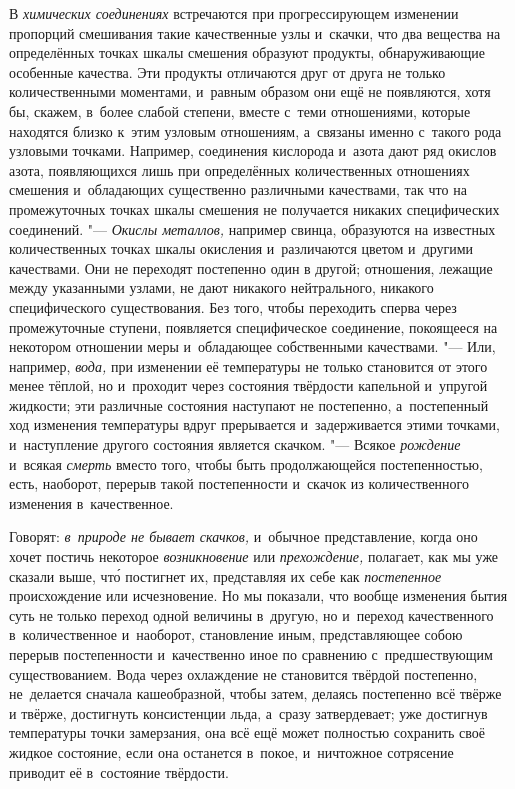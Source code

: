 В {\em химических соединениях} встречаются при прогрессирующем изменении
пропорций смешивания такие качественные узлы и~скачки, что два вещества на
определённых точках шкалы смешения образуют продукты, обнаруживающие особенные
качества. Эти продукты отличаются друг от друга не только количественными
моментами, и~равным образом они ещё не появляются, хотя бы, скажем, в~более
слабой степени, вместе с~теми отношениями, которые находятся близко к~этим
узловым отношениям, а~связаны именно с~такого рода узловыми точками. Например,
соединения кислорода и~азота дают ряд окислов азота, появляющихся лишь при
определённых количественных отношениях смешения и~обладающих существенно
различными качествами, так что на промежуточных точках шкалы смешения не
получается никаких специфических соединений. "--- {\em Окислы металлов,}
например свинца, образуются на известных количественных точках шкалы окисления
и~различаются цветом и~другими качествами. Они не переходят постепенно один в
другой; отношения, лежащие между указанными узлами, не дают никакого
нейтрального, никакого специфического существования. Без того, чтобы переходить
сперва через промежуточные ступени, появляется специфическое соединение,
покоящееся на некотором отношении меры и~обладающее собственными качествами.
"--- Или, например, {\em вода,} при изменении её температуры не только
становится от этого менее тёплой, но и~проходит через состояния твёрдости
капельной и~упругой жидкости; эти различные состояния наступают не постепенно,
а~постепенный ход изменения температуры вдруг прерывается и~задерживается этими
точками, и~наступление другого состояния является скачком. "--- Всякое
{\em рождение} и~всякая {\em смерть} вместо того, чтобы быть продолжающейся
постепенностью, есть, наоборот, перерыв такой постепенности и~скачок из
количественного изменения в~качественное.

Говорят: {\em в~природе не бывает скачков,} и~обычное представление, когда оно
хочет постичь некоторое {\em возникновение} или {\em прехождение,} полагает,
как мы уже сказали выше, чт\'{о} постигнет их, представляя их себе как
{\em постепенное} происхождение или исчезновение. Но мы показали, что вообще
изменения бытия суть не только переход одной величины в~другую, но и~переход
качественного в~количественное и~наоборот, становление иным, представляющее
собою перерыв постепенности и~качественно иное по сравнению с~предшествующим
существованием. Вода через охлаждение не становится твёрдой постепенно,
не~делается сначала кашеобразной, чтобы затем, делаясь постепенно всё твёрже и
твёрже, достигнуть консистенции льда, а~сразу затвердевает; уже достигнув
температуры точки замерзания, она всё ещё может полностью сохранить своё жидкое
состояние, если она останется в~покое, и~ничтожное сотрясение приводит её
в~состояние твёрдости.

